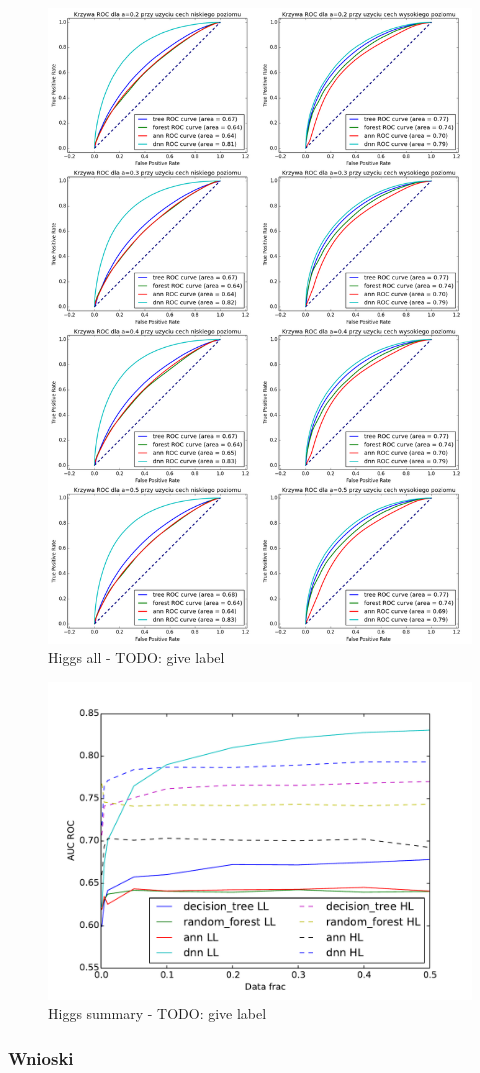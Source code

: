 \begin{figure}[ht!]
\centering
\includegraphics[scale=0.3]{res/all2.png}
\caption[Caption for LOF]{Higgs all - TODO: give label\label{higgsall}}
\end{figure} 

\begin{figure}[ht!]
\centering
\includegraphics[scale=0.8]{res/higgssummary.pdf}
\caption[Caption for LOF]{Higgs summary - TODO: give label \label{higgssummary}}
\end{figure} 

\subsubsection{Wnioski}

